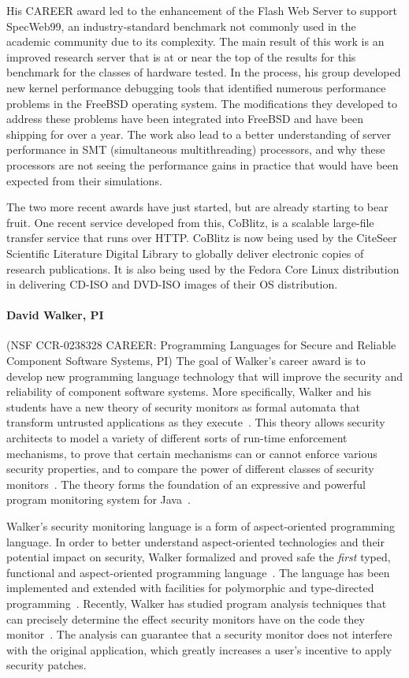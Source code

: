 \documentclass[10pt]{article}
\begin{document}
His CAREER award led to the enhancement of the Flash Web Server to
support SpecWeb99, an industry-standard benchmark not commonly used in
the academic community due to its complexity. The main result of this
work is an improved research server that is at or near the top of the
results for this benchmark for the classes of hardware tested. In the
process, his group developed new kernel performance debugging tools
that identified numerous performance problems in the FreeBSD operating
system. The modifications they developed to address these problems
have been integrated into FreeBSD and have been shipping for over a
year.  The work also lead to a better understanding of server
performance in SMT (simultaneous multithreading) processors, and why
these processors are not seeing the performance gains in practice that
would have been expected from their simulations.

The two more recent awards have just started, but are already starting
to bear fruit. One recent service developed from this, CoBlitz, is a
scalable large-file transfer service that runs over HTTP. CoBlitz is
now being used by the CiteSeer Scientific Literature Digital Library
to globally deliver electronic copies of research publications. It is
also being used by the Fedora Core Linux distribution in delivering
CD-ISO and DVD-ISO images of their OS distribution.

\paragraph*{David Walker, PI} (NSF CCR-0238328 CAREER: Programming Languages for Secure and Reliable Component Software
Systems, PI)
The goal of Walker's career award is to develop new programming language
technology that will improve the security and reliability of 
component software systems.  More specifically, Walker and his students have 
a new theory of security monitors as formal
automata that transform untrusted applications as they 
execute~\cite{ligatti+:edit-automata}.
This theory allows security
architects to model a variety of different sorts of run-time
enforcement mechanisms, to prove that certain mechanisms can or cannot
enforce various security properties, and to compare the power of
different classes of security monitors~\cite{ligatti+:renewal}.
The theory forms the foundation of an expressive and powerful
program monitoring system for Java~\cite{bauer+:polymer}.

Walker's security monitoring language is a form of 
aspect-oriented programming language.
In order to better understand aspect-oriented technologies and their
potential impact on security, Walker formalized and proved
safe the {\em first} typed, functional and 
aspect-oriented programming language~\cite{walker+:aspects}.
The language has been implemented and
extended with facilities for polymorphic
and type-directed programming~\cite{dantas+:polyaml}.  
Recently, Walker has studied program analysis techniques
that can precisely determine the effect security monitors have on
the code they monitor~\cite{dantas+:harmless-advice,dantas+:harmless-popl}.   
The analysis
can guarantee that a security monitor does not interfere with the 
original application, which greatly increases a user's incentive
to apply security patches.
\end{document}
